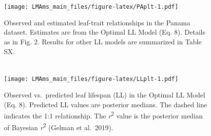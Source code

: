 \documentclass[
  12pt,
]{article}
\providecommand{\DIFaddbeginFL}{} %
\providecommand{\DIFaddendFL}{} %
\providecommand{\DIFdelbeginFL}{} %
\providecommand{\DIFdelendFL}{} %
\newcommand{\DIFscaledelfig}{0.5}
\newlength{\DIFdelgraphicswidth} %
\newlength{\DIFdelgraphicsheight} %
\newcommand{\DIFaddincludegraphics}[2][]{{\color{blue}\fbox{\DIFOincludegraphics[#1]{#2}}}} %
\newcommand{\DIFdelincludegraphics}[2][]{%
\sbox{\DIFdelgraphicsbox}{\DIFOincludegraphics[#1]{#2}}%
\settoboxwidth{\DIFdelgraphicswidth}{\DIFdelgraphicsbox} %
\settoboxtotalheight{\DIFdelgraphicsheight}{\DIFdelgraphicsbox} %
\scalebox{\DIFscaledelfig}{%
\parbox[b]{\DIFdelgraphicswidth}{\usebox{\DIFdelgraphicsbox}\\[-\baselineskip] \rule{\DIFdelgraphicswidth}{0em}}\llap{\resizebox{\DIFdelgraphicswidth}{\DIFdelgraphicsheight}{%
\setlength{\unitlength}{\DIFdelgraphicswidth}%
\begin{picture}(1,1)%
\thicklines\linethickness{2pt} %
{\color[rgb]{1,0,0}\put(0,0){\framebox(1,1){}}}%
{\color[rgb]{1,0,0}\put(0,0){\line( 1,1){1}}}%
{\color[rgb]{1,0,0}\put(0,1){\line(1,-1){1}}}%
\end{picture}%
}\hspace*{3pt}}} %
} %
\DeclareRobustCommand{\DIFaddbeginFL}{\DIFOaddbeginFL \let\includegraphics\DIFaddincludegraphics} %
\DeclareRobustCommand{\DIFaddendFL}{\DIFOaddendFL \let\includegraphics\DIFOincludegraphics} %
\DeclareRobustCommand{\DIFdelbeginFL}{\DIFOdelbeginFL \let\includegraphics\DIFdelincludegraphics} %
\DeclareRobustCommand{\DIFdelendFL}{\DIFOaddendFL \let\includegraphics\DIFOincludegraphics} %
\begin{document}
\newpage

\hypertarget{section-3}{%
\section{}\label{section-3}}

\begin{figure}
\centering
\DIFdelbeginFL %
\DIFdelendFL \DIFaddbeginFL \texttt{[image: LMAms\_main\_files/figure-latex/PAplt-1.pdf]}
\DIFaddendFL \caption{\label{fig:PAplt}Observed and estimated leaf-trait relationships in the Panama dataset. Estimates are from the Optimal LL Model (Eq. 8). Details as in Fig. 2. Results for other LL models are summarized in Table SX.}
\end{figure}

\newpage

\hypertarget{section-4}{%
\section{}\label{section-4}}

\begin{figure}
\centering
\DIFdelbeginFL %
\DIFdelendFL \DIFaddbeginFL \texttt{[image: LMAms\_main\_files/figure-latex/LLplt-1.pdf]}
\DIFaddendFL \caption{\label{fig:LLplt}Observed vs.~predicted leaf lifespan (LL) in the Optimal LL Model (Eq. 8). Predicted LL values are posterior medians. The dashed line indicates the 1:1 relationship. The \emph{r}\textsuperscript{2} value is the posterior median of Bayesian \emph{r}\textsuperscript{2} (Gelman et al.~2019).}
\end{figure}

\newpage

\hypertarget{section-5}{%
\section{}\label{section-5}}
\end{document}
